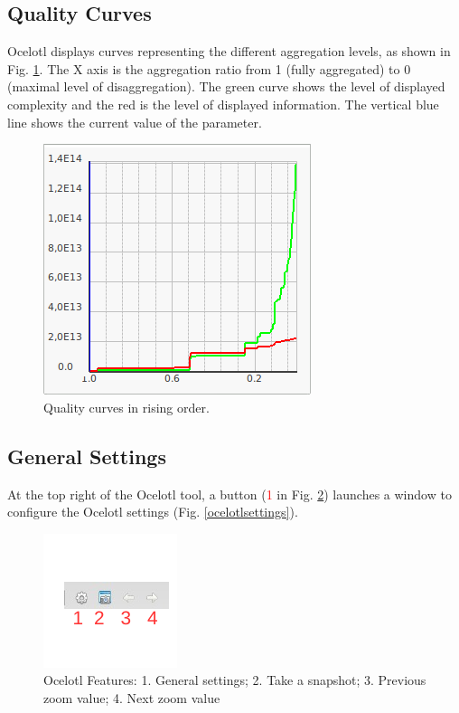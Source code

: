 \documentclass[twoside]{article}
\begin{document}
\begin{sloppypar}
\subsection{Quality Curves}
Ocelotl displays curves representing the different aggregation levels, as shown in Fig. \ref{aggregCurves}. The X axis is the aggregation ratio from 1 (fully aggregated) to 0 (maximal level of disaggregation). %
The green curve shows the level of displayed complexity and the red is the level of displayed information. 
The vertical blue line shows the current value of the parameter.

\begin{figure}[h!]
	\centering
	\includegraphics[scale=0.5]{images/ocelotlCurves.png}
	\caption{Quality curves in rising order.}
	\label{aggregCurves}
\end{figure}

\subsection{General Settings}
At the top right of the Ocelotl tool, a button (\textcolor{red}{1} in Fig. \ref{ocelotlButtons}) launches a window to configure the Ocelotl settings (Fig. \ref{ocelotlsettings}).
\begin{figure}[h!]
	\centering
	\includegraphics[scale=1.5]{images/ocelotlButtons.pdf}
	\caption{Ocelotl Features: 1. General settings; 2. Take a snapshot; 3. Previous zoom value; 4. Next zoom value}
	\label{ocelotlButtons}
\end{figure}


\end{sloppypar}
\end{document}

